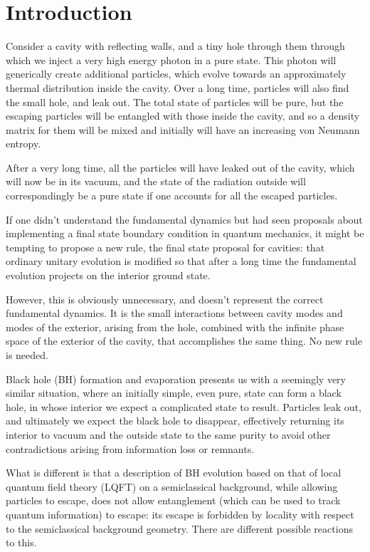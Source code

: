 \documentclass[11pt]{article}
\numberwithin{equation}{section}
\begin{document}
\section{Introduction}

Consider a cavity with reflecting walls, and a tiny hole through them through which we inject a very high energy photon in a pure state.  This photon will generically create additional particles, which evolve towards an approximately thermal distribution inside the cavity.  Over a long time, particles will also  find the small hole, and leak out.  The total state of particles will be pure, but the escaping particles will be entangled with those inside the cavity, and so a density matrix for them will be mixed and initially will have an increasing von Neumann entropy.

After a very long time, all the particles will have leaked out of the cavity, which will now be in its vacuum, and the state of the radiation outside will correspondingly be a pure state if one accounts for all the escaped particles.  

If one didn't understand the fundamental dynamics but had seen proposals about implementing a final state boundary condition in quantum mechanics\cite{ABL,Griffiths:1984rx,Gell-Mann:1991kdm},
it might be tempting to propose a new rule,  the final state proposal for cavities: that ordinary unitary evolution is modified so that after a long time the fundamental evolution  projects on the interior ground state.  

However, this is obviously unnecessary, and doesn't represent the correct fundamental dynamics. It is the small interactions between cavity modes and modes of the exterior, arising from the hole, combined with the infinite phase space of the exterior of the cavity, that accomplishes the same thing.  No new rule is needed.

Black hole (BH) formation and evaporation presents us with a seemingly very similar situation, where an initially simple, even pure, state can form a black hole, in whose interior we expect a complicated state to result.  Particles leak out, and ultimately we expect the black hole to disappear, effectively returning its interior to vacuum and the outside state to the same purity to avoid other contradictions arising from information loss\cite{Hawk-incoh,BPS} or remnants\cite{CaWi,Pres,WABHIP,Susstrouble}.  

What is different is that a description of BH evolution based on that of local quantum field theory (LQFT) on a semiclassical background, while allowing particles to escape\cite{Hawk}, does not allow entanglement (which can be used to track quantum information) to escape: its escape is forbidden by locality with respect to the semiclassical background geometry.  There are different possible reactions to this.
\end{document}
